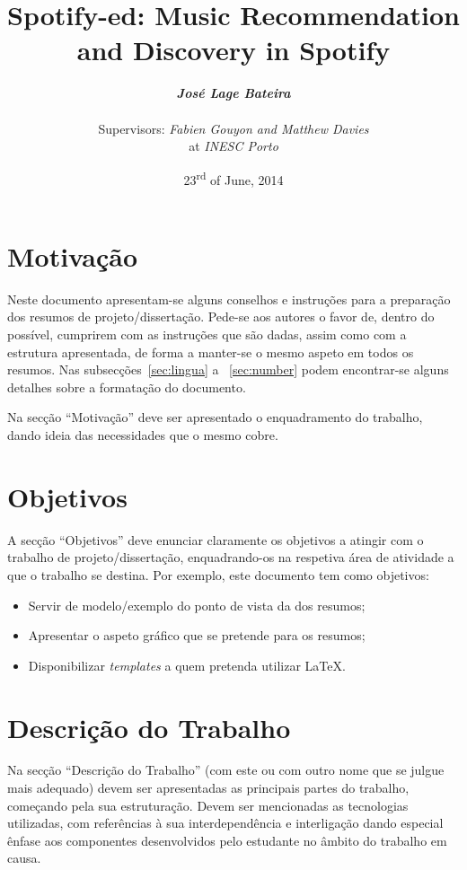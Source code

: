 \documentclass[twocolumn]{article}
\title{
  \huge
  \textbf{
    Spotify-ed: Music Recommendation and Discovery in Spotify
  }
}
\author{
  \large{\emph{\textbf{José Lage Bateira}}} \\ \\
  Supervisors: \emph{Fabien Gouyon and Matthew Davies}  \\
  at \emph{INESC Porto}
}
\date{23\textsuperscript{rd} of June, 2014}
\begin{document}
\maketitle

\thispagestyle{empty}

\section{Motivação}\label{sec:motiva}

Neste documento apresentam-se alguns conselhos e instruções para a preparação dos resumos de projeto/dissertação. 
Pede-se aos autores o favor de, dentro do possível, cumprirem com as instruções que são dadas, assim como com a estrutura apresentada, de forma a manter-se o mesmo aspeto em todos os resumos. 
Nas subsecções~\ref{sec:lingua} a ~\ref{sec:number} podem encontrar-se alguns detalhes sobre a formatação do documento. 

Na secção ``Motivação'' deve ser apresentado o enquadramento do trabalho, dando ideia das necessidades que o mesmo cobre.

\section{Objetivos}\label{sec:goals}

A secção ``Objetivos'' deve enunciar claramente os objetivos a atingir com o trabalho de projeto/dissertação, enquadrando-os na respetiva área de atividade a que o trabalho se destina. 
Por exemplo, este documento tem como objetivos:
\begin{itemize}
\item Servir de modelo/exemplo do ponto de vista da dos resumos;
\item Apresentar o aspeto gráfico que se pretende para os resumos;
\item Disponibilizar \emph{templates} a quem pretenda utilizar \LaTeX.
\end{itemize}

\section{Descrição do Trabalho}\label{sec:work}

Na secção ``Descrição do Trabalho'' (com este ou com outro nome que se julgue mais adequado) devem ser apresentadas as principais partes do trabalho, começando pela sua estruturação. Devem ser mencionadas as tecnologias utilizadas, com referências à sua interdependência e interligação dando especial ênfase aos componentes desenvolvidos pelo estudante no âmbito do trabalho em causa.
\end{document}
